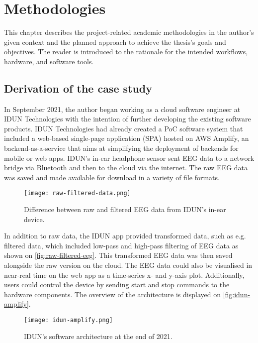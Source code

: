 \chapter{Methodologies}
\graphicspath{{Chapter3/Figs/}{Chapter3/Figs/}}

This chapter describes the project-related academic methodologies in the author's given context and the planned approach to achieve the thesis's goals and objectives. The reader is introduced to the rationale for the intended workflows, hardware, and software tools.

\section{Derivation of the case study}
\label{chapter3-derivation-of-the-case-study}

In September 2021, the author began working as a cloud software engineer at IDUN Technologies with the intention of further developing the existing software products. IDUN Technologies had already created a PoC software system that included a web-based single-page application (SPA) hosted on AWS Amplify, an backend-as-a-service that aims at simplifying the deployment of backends for mobile or web apps. IDUN's in-ear headphone sensor sent EEG data to a network bridge via Bluetooth and then to the cloud via the internet. The raw EEG data was saved and made available for download in a variety of file formats.

\begin{figure}[!ht]
  \centering
  \texttt{[image: raw-filtered-data.png]}
  \caption{Difference between raw and filtered EEG data from IDUN's in-ear device.}
  \label{fig:raw-filtered-eeg}
\end{figure}

In addition to raw data, the IDUN app provided transformed data, such as e.g. filtered data, which included low-pass and high-pass filtering of EEG data as shown on \autoref{fig:raw-filtered-eeg}. This transformed EEG data was then saved alongside the raw version on the cloud. The EEG data could also be visualised in near-real time on the web app as a time-series x- and y-axis plot. Additionally, users could control the device by sending start and stop commands to the hardware components. The overview of the architecture is displayed on \autoref{fig:idun-amplify}.

\begin{figure}[!ht]
  \centering
  \texttt{[image: idun-amplify.png]}
  \caption{IDUN's software architecture at the end of 2021.}
  \label{fig:idun-amplify}
\end{figure}

